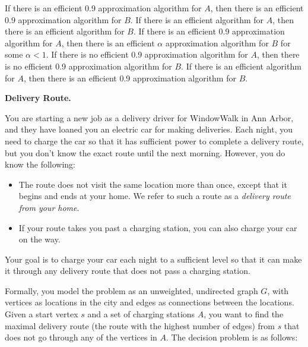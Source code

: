 \documentclass[11pt,addpoints,answers]{exam}
\begin{document}
\begin{questions}
\begin{parts}
    \begin{checkboxes}
        \choice If there is an efficient 0.9 approximation algorithm for $A$, then there is an efficient 0.9 approximation algorithm for $B$.
        \CorrectChoice If there is an efficient algorithm for $A$, then there is an efficient algorithm for $B$.
        \choice If there is an efficient 0.9 approximation algorithm for $A$, then there is an efficient $\alpha$ approximation algorithm for $B$ for some $\alpha < 1$.
        \choice If there is no efficient 0.9 approximation algorithm for $A$, then there is no efficient 0.9 approximation algorithm for $B$.
        \CorrectChoice If there is an efficient algorithm for $A$, then there is an efficient 0.9 approximation algorithm for $B$.
    \end{checkboxes}

    \begin{solution}

    \end{solution}
    
    \end{parts}
    

    \question [15] \textbf{Delivery Route.}

    You are starting a new job as a delivery driver for WindowWalk in Ann Arbor, and they have loaned you an electric car for making deliveries. Each night, you need to charge the car so that it has sufficient power to complete a delivery route, but you don't know the exact route until the next morning. However, you do know the following:
    \begin{itemize}
        \item The route does not visit the same location more than once, except that it begins and ends at your home. We refer to such a route as a \emph{delivery route from your home}.
        \item If your route takes you past a charging station, you can also charge your car on the way.
    \end{itemize}
    Your goal is to charge your car each night to a sufficient level so that it can make it through any delivery route that does not pass a charging station.

    Formally, you model the problem as an unweighted, undirected graph $G$, with vertices as locations in the city and edges as connections between the locations. Given a start vertex $s$ and a set of charging stations $A$, you want to find the maximal delivery route (the route with the highest number of edges) from $s$ that does not go through any of the vertices in $A$. The decision problem is as follows:
    

\end{questions}
\end{document}
